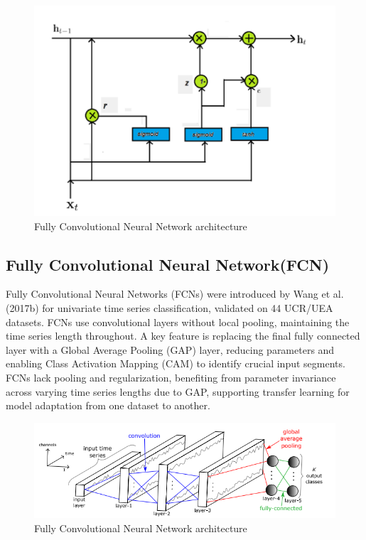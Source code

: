 \documentclass{ieeeojies}
\begin{document}
\begin{figure}[H]
    \centering
\begin{minipage}{0.5\textwidth}
        \centering
        \includegraphics[width=\textwidth]{bibliography/Figure/GRU_diagram.png}
        \caption{Fully Convolutional Neural Network architecture}
        \label{fig:3}
\end{minipage}
\end{figure}

\subsection{Fully Convolutional Neural Network(FCN)}
Fully Convolutional Neural Networks (FCNs) were introduced by Wang et al. (2017b) for univariate time series classification, validated on 44 UCR/UEA datasets. FCNs use convolutional layers without local pooling, maintaining the time series length throughout. A key feature is replacing the final fully connected layer with a Global Average Pooling (GAP) layer, reducing parameters and enabling Class Activation Mapping (CAM) to identify crucial input segments. 
FCNs lack pooling and regularization, benefiting from parameter invariance across varying time series lengths due to GAP, supporting transfer learning for model adaptation from one dataset to another.\cite{Ismail}

\begin{figure}[H]
    \centering
\begin{minipage}{0.5\textwidth}
        \centering
        \includegraphics[width=\textwidth]{bibliography/Figure/FCN.png}
        \caption{Fully Convolutional Neural Network architecture}
        \label{fig:3}
\end{minipage}
\end{figure}
\end{document}
